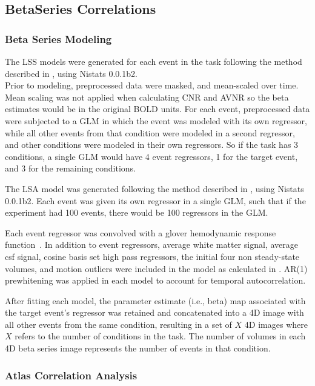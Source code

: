 \documentclass[phd,appendix,figures]{uithesis}
\begin{document}
\subsection*{BetaSeries Correlations}
\label{methods:bsc}

\subsubsection*{Beta Series Modeling}
\label{methods:bsc_model}

The LSS models were generated for each event in
the task following the method described in \cite[Turner (2012)]{Turner2012a}, using
Nistats 0.0.1b2.\\
Prior to modeling, preprocessed data were masked, and mean-scaled over
time.
Mean scaling was not applied when calculating CNR and AVNR so the
beta estimates would be in the original BOLD units.
For each event, preprocessed data were subjected to a GLM
in which the event was modeled with its own regressor, while
all other events from that condition were modeled in a second regressor,
and other conditions were modeled in their own regressors.
So if the task has 3 conditions, 
a single GLM would have 4 event regressors, 1 for the target
event, and 3 for the remaining conditions.

The LSA model was generated following the method described in
\cite[Rissman (2004)]{Rissman2004}, using Nistats 0.0.1b2.
Each event was given its own regressor in a single GLM, such that
if the experiment had 100 events, there would be 100 regressors in the GLM.

Each event regressor was convolved with a glover hemodynamic response
function~\cite{Glover1999}.
In addition to event regressors, average white matter signal, average csf signal,
cosine basis set high pass regressors, the initial four non steady-state volumes, 
and motion outliers were included
in the model as calculated in .
AR(1) prewhitening was applied in each model to account
for temporal autocorrelation.

After fitting each model, the parameter estimate (i.e., beta) map
associated with the target event's regressor was retained and
concatenated into a 4D image with all other events from the same
condition, resulting in a set of $X$ 4D images where $X$ refers to the
number of conditions in the task.
The number of volumes in each 4D beta series image
represents the number of events in that condition.

\subsubsection*{Atlas Correlation Analysis}
\label{methods:atlas-corr-analysis}
\end{document}

